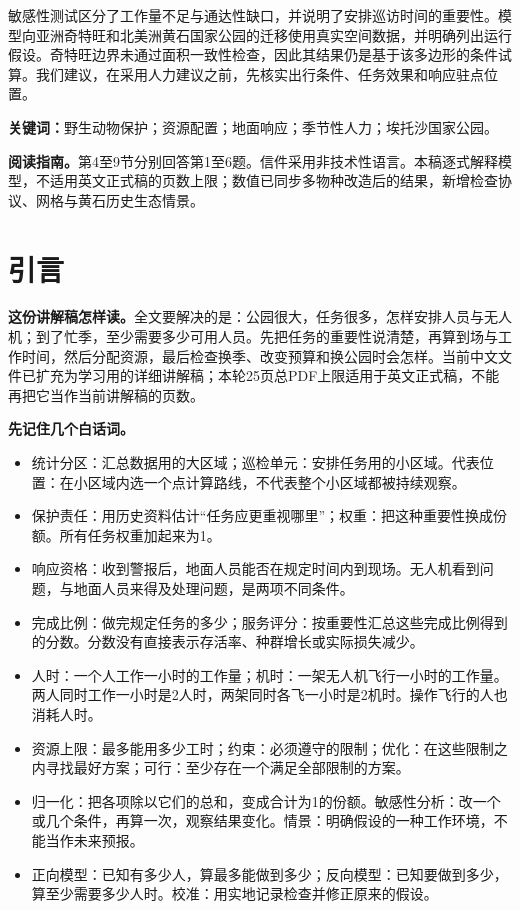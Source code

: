 \documentclass[12pt,a4paper]{article}
\numberwithin{equation}{section}
\begin{document}
敏感性测试区分了工作量不足与通达性缺口，并说明了安排巡访时间的重要性。模型向亚洲奇特旺和北美洲黄石国家公园的迁移使用真实空间数据，并明确列出运行假设。奇特旺边界未通过面积一致性检查，因此其结果仍是基于该多边形的条件试算。我们建议，在采用人力建议之前，先核实出行条件、任务效果和响应驻点位置。

\noindent\textbf{关键词：}野生动物保护；资源配置；地面响应；季节性人力；埃托沙国家公园。
\clearpage

\begingroup
\titleformat{\section}{\centering\fontsize{22}{33}\selectfont\bfseries}{}{0pt}{}
\tableofcontents
\endgroup
\vfill
\noindent\textbf{阅读指南。}第4至9节分别回答第1至6题。信件采用非技术性语言。本稿逐式解释模型，不适用英文正式稿的页数上限；数值已同步多物种改造后的结果，新增检查协议、网格与黄石历史生态情景。
\clearpage

\section{引言}
\noindent\textbf{这份讲解稿怎样读。}全文要解决的是：公园很大，任务很多，怎样安排人员与无人机；到了忙季，至少需要多少可用人员。先把任务的重要性说清楚，再算到场与工作时间，然后分配资源，最后检查换季、改变预算和换公园时会怎样。当前中文文件已扩充为学习用的详细讲解稿；本轮25页总PDF上限适用于英文正式稿，不能再把它当作当前讲解稿的页数。

\noindent\textbf{先记住几个白话词。}
\begin{itemize}
\item 统计分区：汇总数据用的大区域；巡检单元：安排任务用的小区域。代表位置：在小区域内选一个点计算路线，不代表整个小区域都被持续观察。
\item 保护责任：用历史资料估计“任务应更重视哪里”；权重：把这种重要性换成份额。所有任务权重加起来为1。
\item 响应资格：收到警报后，地面人员能否在规定时间内到现场。无人机看到问题，与地面人员来得及处理问题，是两项不同条件。
\item 完成比例：做完规定任务的多少；服务评分：按重要性汇总这些完成比例得到的分数。分数没有直接表示存活率、种群增长或实际损失减少。
\item 人时：一个人工作一小时的工作量；机时：一架无人机飞行一小时的工作量。两人同时工作一小时是2人时，两架同时各飞一小时是2机时。操作飞行的人也消耗人时。
\item 资源上限：最多能用多少工时；约束：必须遵守的限制；优化：在这些限制之内寻找最好方案；可行：至少存在一个满足全部限制的方案。
\item 归一化：把各项除以它们的总和，变成合计为1的份额。敏感性分析：改一个或几个条件，再算一次，观察结果变化。情景：明确假设的一种工作环境，不能当作未来预报。
\item 正向模型：已知有多少人，算最多能做到多少；反向模型：已知要做到多少，算至少需要多少人时。校准：用实地记录检查并修正原来的假设。
\end{itemize}
\end{document}

